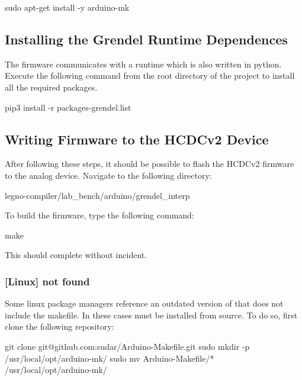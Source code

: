 \begin{snippet}
sudo apt-get install -y arduino-mk
\end{snippet}

\subsection{Installing the Grendel Runtime Dependences}


The firmware communicates with a runtime which is also written in python.
Execute the following command from the root directory of the 
project to install all the required packages.

\begin{snippet}
  pip3 install -r packages-grendel.list
\end{snippet}

\subsection{Writing Firmware to the HCDCv2 Device}
After following these steps, it should be possible to flash the HCDCv2
firmware to the analog device. Navigate to the following directory:

\begin{snippet}
  legno-compiler/lab_bench/arduino/grendel_interp
\end{snippet}

To build the firmware, type the following command:
\begin{snippet}
  make
\end{snippet}

This should complete without incident. 


\subsubsection{[Linux]  not found}

Some linux package managers reference an outdated version of 
that does not include the  makefile. In these cases 
must be installed from source. To do so, first clone the following repository:

\begin{snippet}
git clone git@github.com:sudar/Arduino-Makefile.git
sudo mkdir -p /usr/local/opt/arduino-mk/
sudo mv Arduino-Makefile/* /usr/local/opt/arduino-mk/
\end{snippet}

